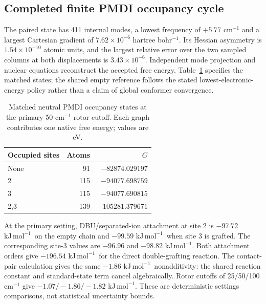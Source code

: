 \documentclass[11pt]{article}
\newcommand{\kj}{\ensuremath{\mathrm{kJ\,mol^{-1}}}}
\begin{document}
\subsection{Completed finite PMDI occupancy cycle}
The paired state has 411 internal modes, a lowest frequency of $+5.77$ cm$^{-1}$ and a largest Cartesian gradient of $7.62\times10^{-6}$ hartree bohr$^{-1}$. Its Hessian asymmetry is $1.54\times10^{-10}$ atomic units, and the largest relative error over the two sampled columns at both displacements is $3.43\times10^{-6}$. Independent mode projection and nuclear equations reconstruct the accepted free energy. Table~\ref{tab:pmdineighbor} specifies the matched states; the shared empty reference follows the stated lowest-electronic-energy policy rather than a claim of global conformer convergence.
\begin{table}[htbp]\centering\small
\caption{Matched neutral PMDI occupancy states at the primary 50 cm$^{-1}$ rotor cutoff. Each graph contributes one native free energy; values are eV.}
\label{tab:pmdineighbor}
\begin{tabular}{lrr}\toprule
Occupied sites & Atoms & $G$\\\midrule
None & 91 & $-82874.029197$\\
2 & 115 & $-94077.698759$\\
3 & 115 & $-94077.690815$\\
2,3 & 139 & $-105281.379671$\\\bottomrule
\end{tabular}\end{table}

At the primary setting, DBU/separated-ion attachment at site 2 is $-97.72$ \kj\ on the empty chain and $-99.59$ \kj\ when site 3 is grafted. The corresponding site-3 values are $-96.96$ and $-98.82$ \kj. Both attachment orders give $-196.54$ \kj\ for the direct double-grafting reaction. The contact-pair calculation gives the same $-1.86$ \kj\ nonadditivity: the shared reaction constant and standard-state term cancel algebraically. Rotor cutoffs of 25/50/100 cm$^{-1}$ give $-1.07/-1.86/-1.82$ \kj. These are deterministic settings comparisons, not statistical uncertainty bounds.
\end{document}

